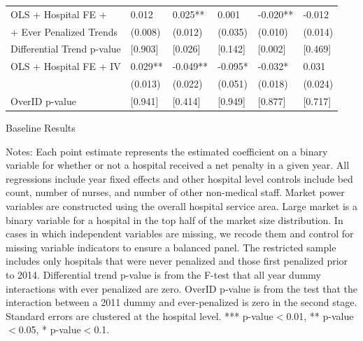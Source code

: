 \documentclass[12pt]{article}
\begin{document}
{\begin{tabular}{llllll}
\hspace{0.05in}OLS	+ Hospital FE +			&	0.012		&	0.025**			&	0.001			&	-0.020**		&	-0.012		\\
\hspace{0.1in} + Ever Penalized Trends		&	(0.008)		&	(0.012)			&	(0.035)			&	(0.010)			&	(0.014)		\\
\hspace{0.1in} Differential Trend p-value 	&	[0.903]		&	[0.026]			&	[0.142]			&	[0.002]			&	[0.469]		\\
\hspace{0.05in}OLS	+ Hospital FE +	IV		&	0.029**		&	-0.049**		&	-0.095*			&	-0.032*			&	0.031		\\
											&	(0.013)		&	(0.022)			&	(0.051)			&	(0.018)			&	(0.024)		\\
\hspace{0.1in} OverID p-value			 	&	[0.941]		&	[0.414]			&	[0.949]			&	[0.877]			&	[0.717]		\\
\hline
\end{tabular}
}
\setlength{\captionmargin}{.5 \textwidth} \addtolength{\captionmargin}{-.5\wd\gfxbox}
\begin{table}[htbp!]
\centering
\caption{Baseline Results}
\label{tab:baselineresults}
\usebox{\gfxbox}
\par
\begin{minipage}{\wd\gfxbox}
\footnotesize
Notes: Each point estimate represents the estimated coefficient on a binary variable for whether or not a hospital received a net penalty in a given year.  All regressions include year fixed effects and other hospital level controls include bed count, number of nurses, and number of other non-medical staff.  Market power variables are constructed using the overall hospital service area.  Large market is a binary variable for a hospital in the top half of the market size distribution.  In cases in which independent variables are missing, we recode them and control for missing variable indicators to ensure a balanced panel.  The restricted sample includes only hospitals that were never penalized and those first penalized prior to 2014.  Differential trend p-value is from the F-test that all year dummy interactions with ever penalized are zero.  OverID p-value is from the test that the interaction between a 2011 dummy and ever-penalized is zero in the second stage.  Standard errors are clustered at the hospital level.  *** p-value$<$0.01, ** p-value$<$0.05, * p-value$<$0.1.
\end{minipage}
\end{table}
\end{document}
